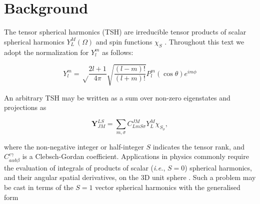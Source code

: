 \documentclass[times]{aastex631}
\newcommand{\nin}{\noindent}
\begin{document}



\section{Background}

The tensor spherical harmonics (TSH) are irreducible tensor products of scalar spherical harmonics $Y_L^M(\Omega)$ and spin functions $\chi_S$ \citep{Edmonds1960}. Throughout this text we adopt the normalization for $Y_l^m$ as follows:

\begin{equation}
  Y_l^m = \sqrt\frac{2l+1}{4\pi}\sqrt{\frac{\left(l-m\right)!}{\left(l+m\right)!}}P_l^m(\cos\theta)e^{im\phi}
\end{equation}

\noindent An arbitrary TSH may be written as a sum over non-zero eigenstates and projections as

\begin{equation}
  \mathbf{Y}_{J M}^{L S} = \sum_{m, \sigma} C_{L m S \sigma}^{J M} Y_{L}^{M}\chi_{S_{\sigma}},
\end{equation}
  
\nin where the non-negative integer or half-integer $S$ indicates the tensor rank, and $C_{a\alpha b \beta}^{c\gamma}$ is a Clebsch-Gordan coefficient. Applications in physics commonly require the evaluation of integrals of products of scalar (\textit{i.e.}, $S=0$) spherical harmonics, and their angular spatial derivatives, on the 3D unit sphere \citep{Radler73,Winch74,Barrera1985}. Such a problem may be cast in terms of the $S=1$ vector spherical harmonics with the generalised form
\end{document}
